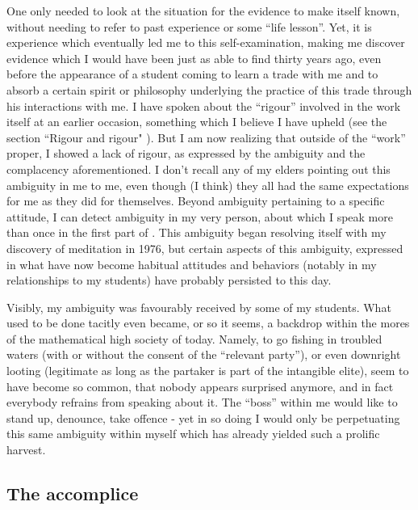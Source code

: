 One only needed to look at the situation for the evidence to make itself known, without
needing to refer to past experience or some ``life lesson''.
Yet, it is experience which eventually led me to this self-examination,
making me discover evidence which I would have been just as able to find thirty
years ago, even before the appearance of a student coming to learn a trade with me 
and to absorb a certain spirit or philosophy underlying the practice of this trade through
his interactions with me. I have spoken about the ``rigour'' involved in the work itself at
an earlier occasion, something which I believe I have upheld (see the section ``Rigour and
rigour" ). But I am now realizing that outside of the ``work'' proper, I showed a
lack of rigour, as expressed by the ambiguity and the complacency aforementioned. 
I don't recall any of my elders pointing out this ambiguity in me to me, even though (I
think) they all had the same expectations for me as they did for themselves. Beyond
ambiguity pertaining to a specific attitude, I can detect ambiguity in my very person,
about which I speak more than once in the first part of \ReS.
This ambiguity began resolving itself with my discovery of meditation in 1976, but certain
aspects of this ambiguity, expressed in what have now become habitual attitudes and
behaviors (notably in my relationships to my students) have probably persisted to this
day. 

Visibly, my ambiguity was favourably received by some of my students. 
What used to be done tacitly even became, or so it seems, a backdrop within the mores of
the mathematical high society of today.
Namely, to go fishing in troubled waters (with or without the consent of the ``relevant
party''), or even downright looting (legitimate as long as the partaker is part of the
intangible elite), seem to have become so common, that nobody appears surprised anymore,
and in fact everybody refrains from speaking about it. The ``boss'' within me would like
to stand up, denounce, take offence - yet in so doing I would only be perpetuating this
same ambiguity within myself which has already yielded such a prolific harvest.

\subsection{The accomplice}

